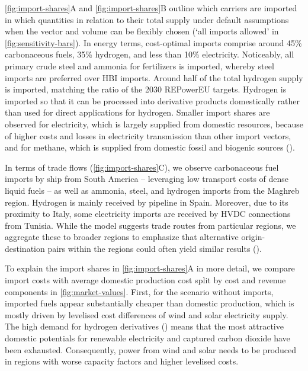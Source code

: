 
\cref{fig:import-shares}A and \cref{fig:import-shares}B outline which carriers are imported in which
quantities in relation to their total supply under default assumptions when the
vector and volume can be flexibly chosen (`all imports allowed' in
\cref{fig:sensitivity-bars}). In energy terms, cost-optimal imports comprise
around 45\% carbonaceous fuels, 35\% hydrogen, and less than 10\% electricity.
Noticeably, all primary crude steel and ammonia for fertilizers is imported,
whereby steel imports are preferred over HBI imports. Around half of the total
hydrogen supply is imported, matching the ratio of the 2030 REPowerEU
targets.\cite{europeancommissionRepowerEUPlan} Hydrogen is imported so that it
can be processed into derivative products domestically rather than used for
direct applications for hydrogen. Smaller import shares are observed for
electricity, which is largely supplied from domestic resources, because of
higher costs and losses in electricity transmission than other import vectors,
and for methane, which is supplied from domestic fossil and biogenic sources
().


In terms of trade flows (\cref{fig:import-shares}C), we observe carbonaceous fuel
imports by ship from South America -- leveraging low transport costs of dense
liquid fuels -- as well as ammonia, steel, and hydrogen imports from the Maghreb
region. Hydrogen is mainly received by pipeline in Spain. Moreover, due to its
proximity to Italy, some electricity imports are received by HVDC connections
from Tunisia. While the model suggests trade routes from particular regions, we
aggregate these to broader regions to emphasize that alternative
origin-destination pairs within the regions could often yield similar results
().


To explain the import shares in \cref{fig:import-shares}A in more detail, we
compare import costs with average domestic production cost split by cost and
revenue components in \cref{fig:market-values}. First, for the scenario without
imports, imported fuels appear substantially cheaper than domestic production,
which is mostly driven by levelised cost differences of wind and solar
electricity supply. The high demand for hydrogen derivatives
() means that the most attractive domestic potentials
for renewable electricity and captured carbon dioxide have been exhausted.
Consequently, power from wind and solar needs to be produced in regions with
worse capacity factors and higher levelised costs.

